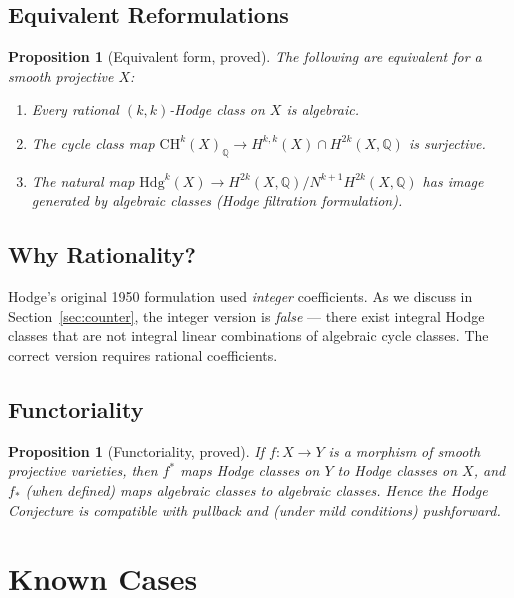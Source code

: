 \documentclass[12pt,a4paper]{amsart}
\newtheorem{proposition}[theorem]{Proposition}
\theoremstyle{definition}
\theoremstyle{remark}
\begin{document}
\subsection{Equivalent Reformulations}

\begin{proposition}[Equivalent form, proved]
The following are equivalent for a smooth projective $X$:
\begin{enumerate}[label=(\roman*)]
\item Every rational $(k,k)$-Hodge class on $X$ is algebraic.
\item The cycle class map $\mathrm{CH}^k(X)_\mathbb{Q} \to H^{k,k}(X) \cap H^{2k}(X,\mathbb{Q})$ is surjective.
\item The natural map $\mathrm{Hdg}^k(X) \to H^{2k}(X, \mathbb{Q}) / N^{k+1} H^{2k}(X,\mathbb{Q})$
  has image generated by algebraic classes (Hodge filtration formulation).
\end{enumerate}
\end{proposition}

\subsection{Why Rationality?}

Hodge's original 1950 formulation used \emph{integer} coefficients. As we discuss in
Section~\ref{sec:counter}, the integer version is \emph{false} — there exist integral
Hodge classes that are not integral linear combinations of algebraic cycle classes.
The correct version requires rational coefficients.

\subsection{Functoriality}

\begin{proposition}[Functoriality, proved]
If $f: X \to Y$ is a morphism of smooth projective varieties, then $f^*$ maps
Hodge classes on $Y$ to Hodge classes on $X$, and $f_*$ (when defined) maps
algebraic classes to algebraic classes. Hence the Hodge Conjecture is compatible
with pullback and (under mild conditions) pushforward.
\end{proposition}

\section{Known Cases}
\label{sec:known}
\end{document}
